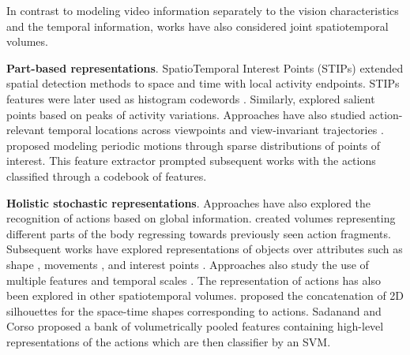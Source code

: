\documentclass[smallextended,twocolumn,natbib]{svjour3}
\begin{document}
In contrast to modeling video information separately to the vision characteristics and the temporal information, works have also considered joint spatiotemporal volumes. 

\noindent
\textbf{Part-based representations}. SpatioTemporal Interest Points (STIPs) \citep{laptev2003space} extended spatial detection methods \citep{forstner1987fast,harris1988combined} to space and time with local activity endpoints. STIPs features were later used as histogram codewords \citep{schuldt2004recognizing}. Similarly, \citep {liu2008learning,oikonomopoulos2005spatiotemporal} explored salient points based on peaks of activity variations. Approaches have also studied action-relevant temporal locations across viewpoints \citep{yilmaz2006matching} and view-invariant trajectories \citep{sheikh2005exploring}. \citet{dollar2005behavior} proposed modeling periodic motions through sparse distributions of points of interest. This feature extractor prompted subsequent works \citep{niebles2008unsupervised} with the actions classified through a codebook of features.

\noindent
\textbf{Holistic stochastic representations}. Approaches have also explored the recognition of actions based on global information. \citet{efros2003recognizing} created volumes representing different parts of the body regressing towards previously seen action fragments. Subsequent works have explored representations of objects over attributes such as shape \citep{gorelick2006shape,jia2008human}, movements \citep{sun2009action}, and interest points \citep{wong2007extracting}. Approaches also study the use of multiple features and temporal scales \citep{amer2012sum,liu2008recognizing,zelnik2001event,yang2020temporal}. The representation of actions has also been explored in other spatiotemporal volumes. \citet{blank2005actions} proposed the concatenation of 2D silhouettes for the space-time shapes corresponding to actions. Sadanand and Corso \citep{sadanand2012action} proposed a bank of volumetrically pooled features containing high-level representations of the actions which are then classifier by an SVM.
\end{document}
